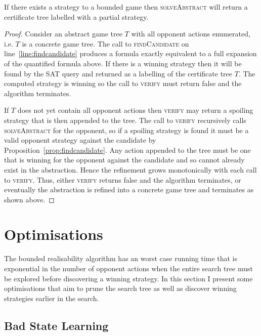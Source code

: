 \begin{theorem}\label{theorem:solveAbstract}
    If there exists a strategy to a bounded game then \textsc{solveAbstract} will return a certificate tree labelled with a partial strategy.
\end{theorem}
\begin{proof}
    Consider an abstract game tree $T$ with all opponent actions enumerated, i.e. $T$ is a concrete game tree. The call to \textsc{findCandidate} on line~\ref{line:findcandidate} produces a formula exactly equivalent to a full expansion of the quantified formula above. If there is a winning strategy then it will be found by the SAT query and returned as a labelling of the certificate tree $T$.  The computed strategy is winning so the call to \textsc{verify} must return false and the algorithm terminates.

    If $T$ does not yet contain all opponent actions then \textsc{verify} may return a spoiling strategy that is then appended to the tree. The call to \textsc{verify} recursively calls \textsc{solveAbstract} for the opponent, so if a spoiling strategy is found it must be a valid opponent strategy against the candidate by Proposition~\ref{prop:findcandidate}. Any action appended to the tree must be one that is winning for the opponent against the candidate and so cannot already exist in the abstraction. Hence the refinement grows monotonically with each call to \textsc{verify}. Thus, either \textsc{verify} returns false and the algorithm terminates, or eventually the abstraction is refined into a concrete game tree and terminates as shown above.
\end{proof}

\section{Optimisations}

The bounded realisability algorithm has an worst case running time that is exponential in the number of opponent actions when the entire search tree must be explored before discovering a winning strategy. In this section I present some optimisations that aim to prune the search tree as well as discover winning strategies earlier in the search.

\subsection{Bad State Learning}
\label{sec:boundedLearning}

